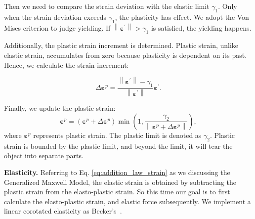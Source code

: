 \documentclass[10pt,journal,compsoc]{IEEEtran}
\begin{document}
Then we need to compare the strain deviation with the elastic limit $\gamma_1$. Only when the strain deviation exceeds $\gamma_1$, the plasticity has effect. We adopt the Von Mises criterion to judge yielding. If $\left\|\mathbf{\varepsilon}^{\prime}\right\|>\gamma_1 $ is satisfied, the yielding happens.

Additionally, the plastic strain increment is determined. Plastic strain, unlike elastic strain, accumulates from zero because plasticity is dependent on its past. Hence, we calculate the strain increment:

\begin{equation}
	\Delta \mathbf{\varepsilon}^p=\frac{\left\|\mathbf{\varepsilon}^{\prime}\right\|-\gamma_1}{\left\|\mathbf{\varepsilon}^{\prime}\right\|} \mathbf{\varepsilon}^{\prime}. \label{eq:plastic-strain-increment}
\end{equation}

Finally, we update the plastic strain:
\begin{equation}
	\mathbf{\varepsilon}^p=\left(\mathbf{\varepsilon}^p+\Delta \mathbf{\varepsilon}^p\right) \min \left(1, \frac{\gamma_2}{\left\|\mathbf{\varepsilon}^p+\Delta \mathbf{\varepsilon}^p\right\|}\right),\label{eq:plastic-strain-accumulated}
\end{equation}
where $\mathbf{\varepsilon}^p$ represents plastic strain.
The plastic limit is denoted as $\gamma_2$. Plastic strain is bounded by the plastic limit, and beyond the limit, it will tear the object into separate parts.


\textbf{Elasticity.}
Referring to Eq. \ref{eq:addition_law_strain} as we discussing the Generalized Maxwell Model, the elastic strain is obtained by subtracting the plastic strain from the elasto-plastic strain.  So this time our goal is to first calculate the elasto-plastic strain, and elastic force subsequently. We implement a linear corotated elasticity as Becker's~\cite{Becker2009}.
\end{document}
